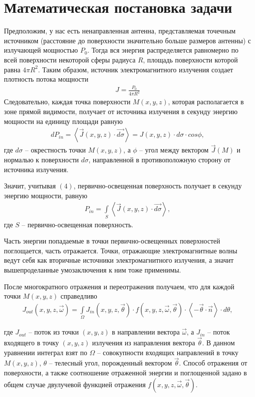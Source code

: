 \newpage
\section*{Математическая постановка задачи}

Предположим, у нас есть ненаправленная антенна, представляемая точечным источником (расстояние до поверхности значительно больше размеров антенны) с излучающей мощностью $P_0$. Тогда вся энергия распределяется равномерно по всей поверхности некоторой сферы радиуса $R$, площадь поверхности которой равна $ 4 \pi R^2 $. Таким образом, источник электромагнитного излучения создает плотность потока мощности
\begin{gather}
   J = \frac{P_0}{4 \pi R^2}
\end{gather}
Следовательно, каждая точка поверхности $ M(x, y, z) $, которая располагается в зоне прямой видимости, получает от источника излучения в секунду энергию мощности на единицу площади равную
\begin{gather}
  dP_{in} =   \left\langle  {\vec{J}(x,y,z) \cdot  \vec{d\sigma} } \right\rangle = J(x,y,z) \cdot d\sigma \cdot cos \phi ,
\end{gather}
где $d\sigma$ -- окрестность точки $ M(x, y, z) $, а $\phi$ -- угол между вектором $ \vec{J}(M) $ и нормалью к поверхности $d\sigma$, направленной в противоположную сторону от источника излучения.  

Значит, учитывая $(4)$, первично-освещенная поверхность получает в секунду энергию мощности, равную 
\begin{gather}
  P_{in} =   \int \limits_S \left\langle  {\vec{J}(x,y,z) \cdot  \vec{d\sigma} } \right\rangle,
\end{gather}
где $ S $ -- первично-освещенная поверхность.

Часть энергии попадаемые в точки первично-освещенных поверхностей поглощается, часть отражается. Точки, отражающие электромагнитные волны ведут себя как вторичные источники электромагнитного излучения, а значит вышепроделанные умозаключения к ним тоже применимы. 

После многократного отражения и переотражения получаем, что для каждой точки $ M(x,y,z) $ справедливо
\begin{gather}
  J_{out}(x,y,z,\vec \omega) = \int \limits_\Omega J_{in}(x,y,z,\vec \theta) \cdot f(x,y,z,\vec \omega,\vec \theta) \cdot \left\langle  {-\vec \theta \cdot \vec n} \right\rangle \cdot d\theta,
\end{gather}

где $ J_{out} $ -- поток из точки $(x,y,z)$ в направлении вектора $ \vec \omega $, а $ J_{in} $ -- поток входящего в точку $(x,y,z)$ излучения из направления вектора $ \vec \theta $. В данном уравнении интеграл взят по $ \Omega $ -- совокупности входящих направлений в точку $M(x,y,z)$, $\theta$ -- телесный угол, порожденный вектором $\vec \theta$. Способ отражения от поверхности, а также соотношение отраженной энергии и поглощенной задано в общем случае двулучевой функцией отражения $ f(x,y,z,\vec \omega,\vec \theta) $. 

